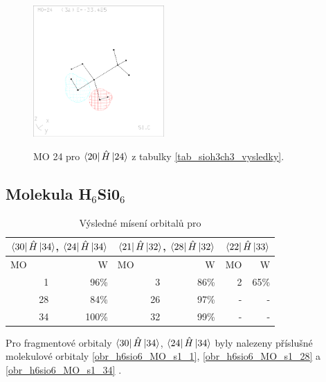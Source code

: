 \documentclass[
  digital, %
  table,   %
  lof,     %
  lot,     %
]{fithesis3}
\begin{document}
\begin{figure}[h]
\caption{MO 24 pro $\bra{20}{\hat{H}}\ket{24}$ z tabulky \ref{tab_sioh3ch3_vysledky}.  }
  \center
  \includegraphics[width=5cm]{sioh3ch3_obrazky/s4_24.eps}
  \label{obr_sioh3ch3_MO_s4_24}
  \end{figure}
  \subsection{Molekula H$_6$Si0$_6$}
 
  \begin{table}[htbp]
\caption{Výsledné mísení orbitalů pro }
\begin{center}
\begin{tabular}{|r|r|r|r|r|r|}
\hline
\multicolumn{2}{|c}{$\bra{30}{\hat{H}}\ket{34}$, $\bra{24}{\hat{H}}\ket{34}$} & \multicolumn{2}{|c|}{$\bra{21}{\hat{H}}\ket{32}$, $\bra{28}{\hat{H}}\ket{32}$}& \multicolumn{2}{|c|}{$\bra{22}{\hat{H}}\ket{33}$} \\
\hline \hline
\multicolumn{1}{|l|}{MO} & \multicolumn{1}{r|}{W} & \multicolumn{1}{l|}{MO} & \multicolumn{1}{r|}{W} & MO & \multicolumn{1}{r|}{W} \\ \hline
1 & 96\% & 3 & 86\% &2 & 65\% \\ \hline
28 & 84\% & 26 & 97\% & - & - \\ \hline
34 & 100\% & 32 & 99\% &  -& - \\ \hline
\end{tabular}
\end{center}
\label{tab_h6sio6_vysledky}
\end{table}

Pro fragmentové orbitaly $\bra{30}{\hat{H}}\ket{34}$, $\bra{24}{\hat{H}}\ket{34}$ byly nalezeny příslušné molekulové orbitaly \ref{obr_h6sio6_MO_s1_1}, \ref{obr_h6sio6_MO_s1_28} a \ref{obr_h6sio6_MO_s1_34} .
  
\end{document}
